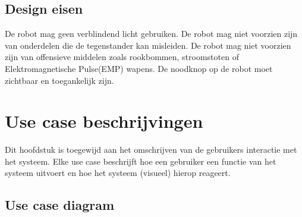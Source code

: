 \documentclass[12pt]{article} %
\begin{document}
\subsection{Design eisen}
\begin{enumerate}
 De robot mag geen verblindend licht gebruiken.
 De robot mag niet voorzien zijn van onderdelen die de tegenstander kan misleiden.
 De robot mag niet voorzien zijn van offensieve middelen zoals rookbommen, stroomstoten of Elektromagnetische Pulse(EMP) wapens.
 De noodknop op de robot moet zichtbaar en toegankelijk zijn.
\end{enumerate}
\newpage

\section{Use case beschrijvingen}
Dit hoofdstuk is toegewijd aan het omschrijven van de gebruikers interactie met het systeem. Elke use case beschrijft hoe een gebruiker een functie van het systeem uitvoert en hoe het systeem (visueel) hierop reageert.

\subsection{Use case diagram}
\end{document}
